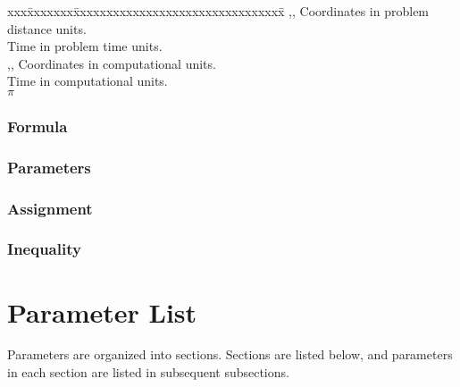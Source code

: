 \begin{tabbing}
xxx\=xxxxxxx\=xxxxxxxxxxxxxxxxxxxxxxxxxxxxxxxx\=\kill
\> ,, \> Coordinates in problem distance units. \\
\>  \> Time in problem time units. \\
\> ,, \> Coordinates in computational units. \\
\>  \> Time in computational units. \\
\>  \> $\pi$ \\
\end{tabbing}

\subsubsection{Formula} 
\subsubsection{Parameters} 
\subsubsection{Assignment} 
\subsubsection{Inequality} 

\section{Parameter List} \label{ss:input-parameters}

Parameters are organized into sections.  Sections are listed below,
and parameters in each section are listed in subsequent subsections.

